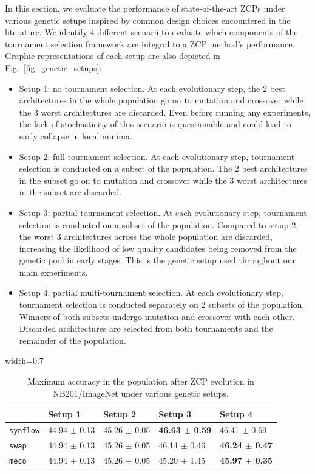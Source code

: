\documentclass[10pt]{article} %
\begin{document}
In this section, we evaluate the performance of state-of-the-art ZCPs under various genetic setups inspired by common design choices encountered in the literature. We identify 4 different scenarii to evaluate which components of the tournament selection framework are integral to a ZCP method's performance. Graphic representations of each setup are also depicted in Fig.~\ref{fig_genetic_setups}:
\begin{itemize}
\item Setup 1: no tournament selection. At each evolutionary step, the 2 best architectures in the whole population go on to mutation and crossover while the 3 worst architectures are discarded. Even before running any experiments, the lack of stochasticity of this scenario is questionable and could lead to early collapse in local minima.
\item Setup 2: full tournament selection. At each evolutionary step, tournament selection is conducted on a subset of the population. The 2 best architectures in the subset go on to mutation and crossover while the 3 worst architectures in the subset are discarded.
\item Setup 3: partial tournament selection. At each evolutionary step, tournament selection is conducted on a subset of the population. Compared to setup 2, the worst 3 architectures across the whole population are discarded, increasing the likelihood of low quality candidates being removed from the genetic pool in early stages. This is the genetic setup used throughout our main experiments.
\item Setup 4: partial multi-tournament selection. At each evolutionary step, tournament selection is conducted separately on 2 subsets of the population. Winners of both subsets undergo mutation and crossover with each other. Discarded architectures are selected from both tournaments and the remainder of the population.
\end{itemize}

\begin{table}[h]
\centering
\caption{Maximum accuracy in the population after ZCP evolution in NB201/ImageNet under various genetic setups.}
\begin{adjustbox}{width=0.7\linewidth}
\begin{tabular}{m{2cm} | m{2.1cm} | m{2.1cm} | m{2.1cm} | m{2.1cm}}
    & Setup 1 & Setup 2 & Setup 3 & Setup 4\\
    \hline

    \texttt{synflow} & 44.94 $\pm$ 0.13 & 45.26 $\pm$ 0.05 & \textbf{46.63 $\pm$ 0.59} & 46.41 $\pm$ 0.69\\

    \texttt{swap} & 44.94 $\pm$ 0.13 & 45.26 $\pm$ 0.05 & 46.14 $\pm$ 0.46 & \textbf{46.24 $\pm$ 0.47}\\

    \texttt{meco} & 44.94 $\pm$ 0.13 & 45.26 $\pm$ 0.05 & 45.20 $\pm$ 1.45 & \textbf{45.97 $\pm$ 0.35}\\

\end{tabular}
\end{adjustbox}
\label{table_abla_genetic_max}
\end{table}
\end{document}
